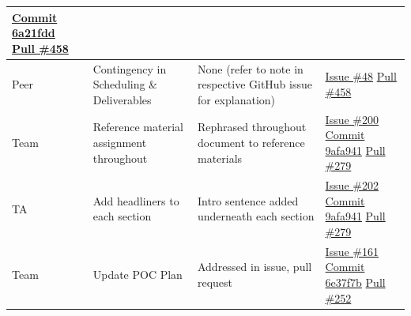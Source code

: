 \documentclass[12pt, titlepage]{article}
\begin{document}
\begin{longtable}{|p{2cm}|p{4cm}|p{5cm}|p{4cm}|}
\newline\href{https://github.com/OmarHassanAdelhamid/Five-of-a-Kind-capstone-project-/pull/458/commits/6a21fdd6bfe9a5b52321a2a1a183a7c353f5511d}{Commit 6a21fdd}
\newline\href{https://github.com/OmarHassanAdelhamid/Five-of-a-Kind-capstone-project-/pull/458}{Pull \#458} \\ \hline
Peer & Contingency in Scheduling \& Deliverables & None (refer to note in respective GitHub issue for explanation) & \href{https://github.com/OmarHassanAdelhamid/Five-of-a-Kind-capstone-project-/issues/48}{Issue \#48}
\newline\href{https://github.com/OmarHassanAdelhamid/Five-of-a-Kind-capstone-project-/pull/458}{Pull \#458} \\ \hline


Team & Reference material assignment throughout & Rephrased throughout document to reference materials & \href{https://github.com/OmarHassanAdelhamid/Five-of-a-Kind-capstone-project-/issues/200}{Issue \#200}
\newline\href{https://github.com/OmarHassanAdelhamid/Five-of-a-Kind-capstone-project-/pull/279/commits/9afa9414904a5737602d6abb4abd919f6d082f43}{Commit 9afa941}
\newline\href{https://github.com/OmarHassanAdelhamid/Five-of-a-Kind-capstone-project-/pull/279}{Pull \#279} \\ \hline
TA & Add headliners to each section & Intro sentence added underneath each section & \href{https://github.com/OmarHassanAdelhamid/Five-of-a-Kind-capstone-project-/issues/202}{Issue \#202}
\newline\href{https://github.com/OmarHassanAdelhamid/Five-of-a-Kind-capstone-project-/pull/279/commits/9afa9414904a5737602d6abb4abd919f6d082f43}{Commit 9afa941}
\newline\href{https://github.com/OmarHassanAdelhamid/Five-of-a-Kind-capstone-project-/pull/279}{Pull \#279} \\ \hline
Team & Update POC Plan & Addressed in issue, pull request & \href{https://github.com/OmarHassanAdelhamid/Five-of-a-Kind-capstone-project-/issues/161}{Issue \#161}
\newline\href{https://github.com/OmarHassanAdelhamid/Five-of-a-Kind-capstone-project-/pull/252/commits/6e37f7bad766dfb49e4cdd5419fdb11361022e50}{Commit 6e37f7b}
\newline\href{https://github.com/OmarHassanAdelhamid/Five-of-a-Kind-capstone-project-/pull/252}{Pull \#252} \\ \hline

\end{longtable}
\end{document}

